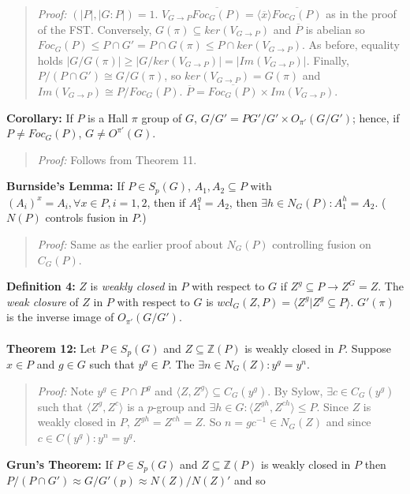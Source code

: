 \begin{quote}
\emph{Proof:}  $(|P|,|G:P|) = 1$.  $V_{G \rightarrow P} {\overline {Foc_G(P)}} = \langle {\overline x} \rangle {\overline {Foc_G(P)}}$ as in the
proof of the FST.  Conversely, $G(\pi) \subseteq ker(V_{G \rightarrow P})$ and ${\overline P}$ is abelian so
$Foc_G(P) \leq P \cap G' = P \cap G(\pi) \leq P \cap ker(V_{G \rightarrow P})$.  As before, equality holds 
$|G/G(\pi)| \geq |G/ker(V_{G \rightarrow P})| = |Im(V_{G\rightarrow P})|$.
Finally, $P/(P \cap G') \cong G/G(\pi)$,
so $ker(V_{G \rightarrow P}) = G(\pi)$ and $Im(V_{G \rightarrow P}) \cong P/Foc_G(P)$.
${\overline P} = {\overline {Foc_G(P)}} \times Im(V_{G \rightarrow P})$.
\end{quote}
{\bf Corollary:} If $P$ is a Hall $\pi$
group of $G$, $G/G'= PG'/G' \times O_{\pi'}(G/G')$; hence, if $P \ne Foc_G(P)$,
$G \ne O^{\pi'}(G)$.
\begin{quote}
\emph{Proof:}  
Follows from Theorem 11.
\end{quote}
{\bf Burnside's Lemma:}  If $P \in S_p(G)$, $A_1, A_2 \subseteq P$ with 
$(A_i)^x = A_i, \forall x \in P, i= 1, 2$, then
if $A_1^g=A_2$, then $\exists h \in N_G(P): A_1^h=A_2$. ($N(P)$ controls fusion in $P$.)
\begin{quote}
\emph{Proof:}  
Same as the earlier proof about $N_G(P)$ controlling fusion on $C_G(P)$.
\end{quote}
{\bf Definition 4:}
$Z$ is \emph {weakly closed} in $P$ with respect to $G$ if $Z^g \subseteq P \rightarrow Z^G=Z$.
The \emph {weak closure} of $Z$ in $P$ with respect to $G$ is 
$wcl_G(Z, P)= \langle Z^g| Z^g \subseteq P \rangle$.  $G'(\pi)$ is the inverse image of
$O_{\pi'}(G/G')$.
\\
\\
{\bf Theorem 12:}
Let $P \in S_p(G)$ and $Z \subseteq {\mathbb Z}(P)$ 
is weakly closed in $P$.  Suppose $x \in P$ and $g \in G$ such that
$y^g \in P$.  The $\exists n \in N_G(Z): y^g=y^n$.
\begin{quote}
\emph{Proof:}  
Note $y^g \in P \cap P^g$ and $ \langle Z, Z^g \rangle \subseteq C_G(y^g )$.  By Sylow,
$\exists c \in C_G(y^g )$ such that 
$ \langle Z^g, Z^c \rangle $ is a $p$-group and $\exists h \in G:
\langle Z^{gh}, Z^{ch} \rangle \le P$.  Since $Z$ is weakly closed in $P$, 
$Z^{gh}= Z^{ch}= Z$. So
$n= g c^{-1} \in N_G(Z)$ and since $c \in C(y^g): y^n= y^g$.
\end{quote}
{\bf Grun's Theorem:} If $P \in S_p(G)$ and $Z \subseteq {\mathbb Z}(P)$ 
is weakly closed in $P$ then
$P/(P \cap G') \approx G/G' (p) \approx N(Z)/N(Z)'$ and so 
